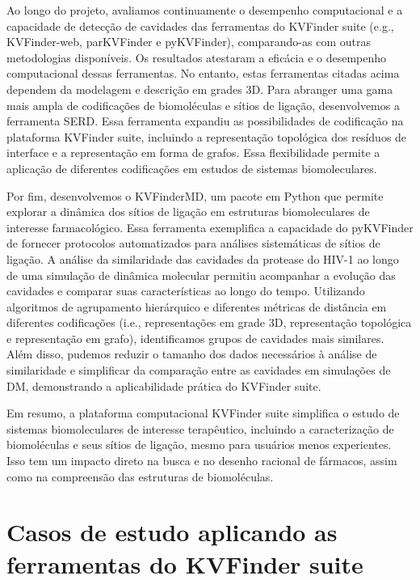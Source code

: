 \documentclass[Portugues]{phdquali}
\def\ie{i.e.\onedot}
\def\eg{e.g.\onedot}
\begin{document}
Ao longo do projeto, avaliamos continuamente o desempenho computacional e a capacidade de detecção de cavidades das ferramentas do KVFinder suite (\eg, KVFinder-web, parKVFinder e pyKVFinder), comparando-as com outras metodologias disponíveis. Os resultados atestaram a eficácia e o desempenho computacional dessas ferramentas. No entanto, estas ferramentas citadas acima dependem da modelagem e descrição em grades 3D. Para abranger uma gama mais ampla de codificações de biomoléculas e sítios de ligação, desenvolvemos a ferramenta SERD. Essa ferramenta expandiu as possibilidades de codificação na plataforma KVFinder suite, incluindo a representação topológica dos resíduos de interface e a representação em forma de grafos. Essa flexibilidade permite a aplicação de diferentes codificações em estudos de sistemas biomoleculares.

Por fim, desenvolvemos o KVFinderMD, um pacote em Python que permite explorar a dinâmica dos sítios de ligação em estruturas biomoleculares de interesse farmacológico. Essa ferramenta exemplifica a capacidade do pyKVFinder de fornecer protocolos automatizados para análises sistemáticas de sítios de ligação. A análise da similaridade das cavidades da protease do HIV-1 ao longo de uma simulação de dinâmica molecular permitiu acompanhar a evolução das cavidades e comparar suas características ao longo do tempo. Utilizando algoritmos de agrupamento hierárquico e diferentes métricas de distância em diferentes codificações (\ie, representações em grade 3D, representação topológica e representação em grafo), identificamos grupos de cavidades mais similares. Além disso, pudemos reduzir o tamanho dos dados necessários à análise de similaridade e simplificar da comparação entre as cavidades em simulações de DM, demonstrando a aplicabilidade prática do KVFinder suite.

Em resumo, a plataforma computacional KVFinder suite simplifica o estudo de sistemas biomoleculares de interesse terapêutico, incluindo a caracterização de biomoléculas e seus sítios de ligação, mesmo para usuários menos experientes. Isso tem um impacto direto na busca e no desenho racional de fármacos, assim como na compreensão das estruturas de biomoléculas.




\appendix

\chapter{Casos de estudo aplicando as ferramentas do KVFinder suite \label{ap:casos-de-estudo}}
\end{document}

